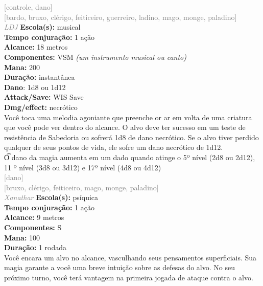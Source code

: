 \documentclass{RPG_Adventure}[2021/10/20]
\begin{document}
{\scriptsize \textcolor{gray}{[controle, dano]\\}}
{\scriptsize \textcolor{gray}{[bardo, bruxo, clérigo, feiticeiro, guerreiro, ladino, mago, monge, paladino]\\}}
{\tiny \textcolor{gray}{\textit{LDJ}}}
{\small \t \textbf{Escola(s):} musical\\\t \textbf{Tempo conjuração:} 1 ação\\\t \textbf{Alcance:} 18 metros\\\t \textbf{Componentes:} VSM \textit{(um instrumento musical ou canto)}\\\t \textbf{Mana:} 200\\\t \textbf{Duração:} instantânea\\\t \textbf{Dano}: 1d8 ou 1d12\\\t \textbf{Attack/Save:} WIS Save\\\t \textbf{Dmg/effect:} necrótico\\}
{\normalsize Você toca uma melodia agoniante que preenche or ar em volta de uma criatura que você pode ver dentro do alcance. O alvo deve ter sucesso em um teste de resistência de Sabedoria ou sofrerá 1d8 de dano necrótico. Se o alvo tiver perdido qualquer de seus pontos de vida, ele sofre um dano necrótico de 1d12.\\\t O dano da magia aumenta em um dado quando atinge o 5º nível (2d8 ou 2d12), 11 º nível (3d8 ou 3d12) e 17º nível (4d8 ou 4d12)\\}
{\scriptsize \textcolor{gray}{[dano]\\}}
{\scriptsize \textcolor{gray}{[bruxo, clérigo, feiticeiro, mago, monge, paladino]\\}}
{\tiny \textcolor{gray}{\textit{Xanathar}}}
{\small \t \textbf{Escola(s):} psíquica\\\t \textbf{Tempo conjuração:} 1 ação\\\t \textbf{Alcance:} 9 metros\\\t \textbf{Componentes:} S\\\t \textbf{Mana:} 100\\\t \textbf{Duração:} 1 rodada\\}
{\normalsize Você encara um alvo no alcance, vasculhando seus pensamentos superficiais. Sua magia garante a você uma breve intuição sobre as defesas do alvo. No seu próximo turno, você terá vantagem na primeira jogada de ataque contra o alvo.\\}
\end{document}
